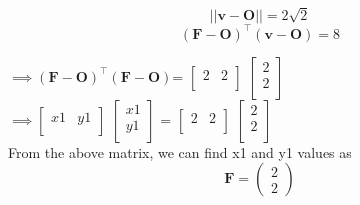 \documentclass[10pt, a4paper]{article}
\newcommand{\myvec}[1]{\ensuremath{\begin{pmatrix}#1\end{pmatrix}}}
\let\vec\mathbf
\begin{document}
$$||\vec{v}-\vec{O}||=2\sqrt{2}$$
$$(\vec{F-O})^{\top}(\vec{v-O})=8$$

$\implies(\vec{F-O})^{\top}(\vec{F-O})$=
$
\begin{bmatrix}
2 & 2 \\
\end{bmatrix}
$
$
\begin{bmatrix}
2 \\
2 \\
\end{bmatrix}
$ \\

$
\implies\begin{bmatrix}
x1 & y1 \\
\end{bmatrix}
$
$
\begin{bmatrix}
x1 \\
y1 \\
\end{bmatrix}
$ = 
$
\begin{bmatrix}
2 & 2 \\
\end{bmatrix}
$
$
\begin{bmatrix}
2 \\
2 \\
\end{bmatrix}
$ \\
\vspace{0.5cm}
From the above matrix, we can find x1 and y1 values as
$$\vec{F}=\myvec{ 2 \\ 2}$$
\end{document}
